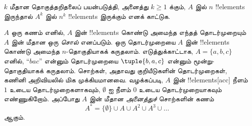 \documentclass[../../../include/open-logic-section]{subfiles}
\begin{document}
\begin{prob}
$k$ மீதான தொகுத்தறிதலைப் பயன்படுத்தி, அனைத்து $k \ge 1$ க்கும்,
$A$ இல் $n$ !!{element}s இருந்தால் $A^k$ இல் $n^k$ !!{element}s
இருக்கும் எனக் காட்டுக.
\end{prob}

\begin{ex}
$A$ ஒரு கணம் எனில், $A$ இன் !!{element}s கொண்டு அமைந்த எந்தத் தொடர்முறையும்
$A$ இன் மீதான ஒரு \emph{சொல்} எனப்படும்.
ஒரு தொடர்முறையை $A$ இன் !!{element}s கொண்டு அமைந்த $n$-தொகுதியாகக் கருதலாம்.
எடுத்துக்காட்டாக, $A = \{a, b, c\}$ எனில்,
``$bac$'' என்னும் தொடர்முறையை $\tuple{b, a, c}$ என்னும் மூன்று-தொகுதியாகக் கருதலாம்.
சொற்கள், அதாவது குறியீடுகளின் தொடர்முறைகள், கணினி அறிவியலில் மிக முக்கியமானவை.
வழக்கப்படி, $A$ இன் !!{element}s[acc] நீளம் $1$ உடைய தொடர்முறைகளாகவும்,
$\emptyset$ ஐ நீளம் $0$ உடைய தொடர்முறையாகவும் எண்ணுகிறோம்.
அப்போது $A$ இன் மீதான \emph{அனைத்துச்} சொற்களின் கணம்
\[
A^* = \{\emptyset\} \cup A \cup A^2 \cup A^3 \cup \dots
\]
ஆகும்.
\end{ex}
\end{document}
